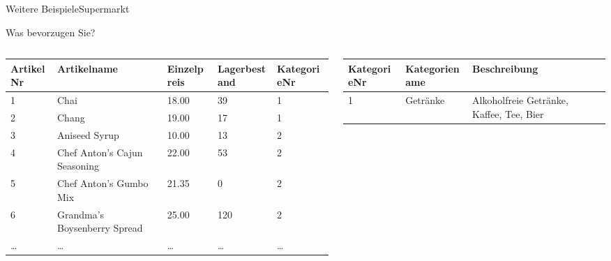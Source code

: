 \begin{frame}{Weitere Beispiele}{Supermarkt}
	\begin{center}
		Was bevorzugen Sie?
	\end{center}
	
	\begin{columns}
		\begin{column}{.6\textwidth}
			\begin{table}[H]
				\tiny\centering
				\begin{tabular}{@{}p{.6cm}|p{1.2cm}|p{.6cm}|p{.6cm}|b@{}}
					\toprule
					\textbf{ArtikelNr} & \textbf{Artikelname}         & \textbf{Einzelpreis} & \textbf{Lagerbestand} & \textbf{KategorieNr} \\ \midrule
					1                  & Chai                         & 18.00                & 39                    & 1                    \\\hline
					2                  & Chang                        & 19.00                & 17                    & 1                    \\\hline
					3                  & Aniseed Syrup                & 10.00                & 13                    & 2                    \\\hline
					4                  & Chef Anton's Cajun Seasoning & 22.00                & 53                    & 2                    \\\hline
					5                  & Chef Anton's Gumbo Mix       & 21.35                & 0                     & 2                    \\\hline
					6                  & Grandma's Boysenberry Spread & 25.00                & 120                   & 2                    \\\hline
					…                  & …                            & …                    & …                     & …                    \\
					\bottomrule
				\end{tabular}
			\end{table}
		\end{column}
		\begin{column}{.4\textwidth}
			\begin{table}[H]
				\tiny\centering
				\begin{tabular}{@{}b|p{1.2cm}|p{1.2cm}@{}}
					\toprule
					\textbf{KategorieNr} & \textbf{Kategoriename}    & \textbf{Beschreibung}                             \\\midrule
					1           & Getränke         & Alkoholfreie Getränke, Kaffee, Tee, Bier \\\hline

\end{tabular}
\end{table}
\end{column}
\end{columns}
\end{frame}
